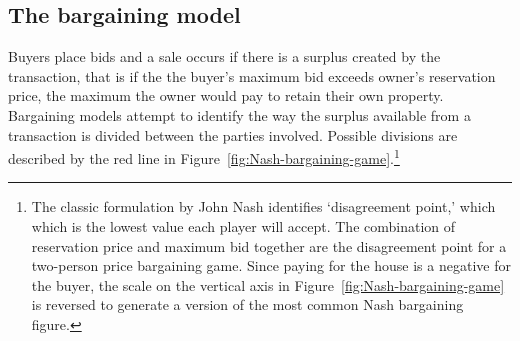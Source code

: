 {%


        

\subsection{The bargaining model} \label{sec:bargaining-model}
Buyers place bids and a sale occurs if there is a surplus created by the transaction, that is if the the buyer's maximum bid exceeds owner's \gls{reservation price}, the maximum the owner would pay to retain their own property. 
Bargaining models attempt to identify the way the surplus available from a transaction is divided between the parties involved. Possible divisions are described by the red line in Figure~\ref{fig:Nash-bargaining-game}.\footnote{The classic  formulation by John Nash %
identifies  `\gls{disagreement point},' which which is the  lowest value each player will accept. The combination of reservation price and maximum bid together are the disagreement point for a two-person price bargaining game. Since paying for the house is a negative for the buyer, the scale on the vertical axis  in Figure~\ref{fig:Nash-bargaining-game} is reversed to generate a version of the most common Nash bargaining figure.} 

}
